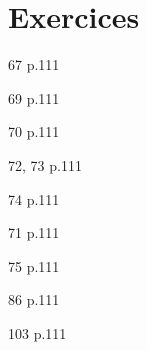 \documentclass[10pt,a4paper,openany,twoside, prof]{book}
\begin{document}
\newpage
\section*{Exercices}
\begin{exercices}
	\begin{bookexo}{67 p.111}\end{bookexo}
	\begin{bookexo}{69 p.111}\end{bookexo}
	\begin{bookexo}{70 p.111}\end{bookexo}
	\begin{bookexos}{72, 73 p.111}\end{bookexos}
	\begin{bookexos}{74 p.111}\end{bookexos}
	\begin{bookexo}{71 p.111}\end{bookexo}
	\begin{bookexo}{75 p.111}\end{bookexo}
	\begin{bookexo}[\diff]{86 p.111}\end{bookexo}
	\begin{bookexo}[\diff\diff]{103 p.111}\end{bookexo}

\end{exercices}
\end{document}
